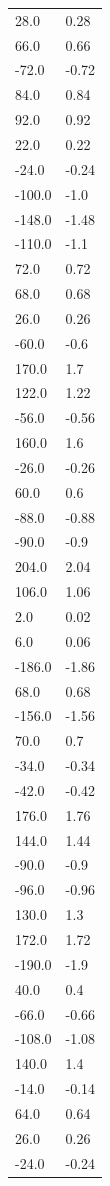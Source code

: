 \begin{longtable}{ll}
28.0 & 0.28 \\
66.0 & 0.66 \\
-72.0 & -0.72 \\
84.0 & 0.84 \\
92.0 & 0.92 \\
22.0 & 0.22 \\
-24.0 & -0.24 \\
-100.0 & -1.0 \\
-148.0 & -1.48 \\
-110.0 & -1.1 \\
72.0 & 0.72 \\
68.0 & 0.68 \\
26.0 & 0.26 \\
-60.0 & -0.6 \\
170.0 & 1.7 \\
122.0 & 1.22 \\
-56.0 & -0.56 \\
160.0 & 1.6 \\
-26.0 & -0.26 \\
60.0 & 0.6 \\
-88.0 & -0.88 \\
-90.0 & -0.9 \\
204.0 & 2.04 \\
106.0 & 1.06 \\
2.0 & 0.02 \\
6.0 & 0.06 \\
-186.0 & -1.86 \\
68.0 & 0.68 \\
-156.0 & -1.56 \\
70.0 & 0.7 \\
-34.0 & -0.34 \\
-42.0 & -0.42 \\
176.0 & 1.76 \\
144.0 & 1.44 \\
-90.0 & -0.9 \\
-96.0 & -0.96 \\
130.0 & 1.3 \\
172.0 & 1.72 \\
-190.0 & -1.9 \\
40.0 & 0.4 \\
-66.0 & -0.66 \\
-108.0 & -1.08 \\
140.0 & 1.4 \\
-14.0 & -0.14 \\
64.0 & 0.64 \\
26.0 & 0.26 \\
-24.0 & -0.24 \\

\end{longtable}
